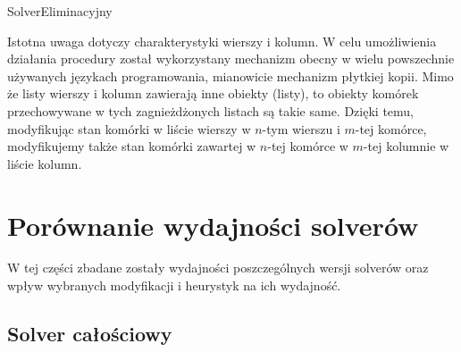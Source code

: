\begin{pseudokod}[H]
    \caption{SolverEliminacyjny}\label{alg:eliminationSolver}
\end{pseudokod}

    Istotna uwaga dotyczy charakterystyki wierszy i kolumn. W celu umożliwienia działania procedury
został wykorzystany mechanizm obecny w wielu powszechnie używanych językach programowania, mianowicie
mechanizm płytkiej kopii. Mimo że listy wierszy i kolumn zawierają inne obiekty (listy), to obiekty
komórek przechowywane w tych zagnieżdżonych listach są takie same. Dzięki temu, modyfikując stan
komórki w liście wierszy w $n$-tym wierszu i $m$-tej komórce, modyfikujemy także stan komórki
zawartej w $n$-tej komórce w $m$-tej kolumnie w liście kolumn.



\section{Porównanie wydajności solverów}
    W tej części zbadane zostały wydajności poszczególnych wersji solverów oraz wpływ wybranych
modyfikacji i heurystyk na ich wydajność.


\subsection{Solver całościowy}

